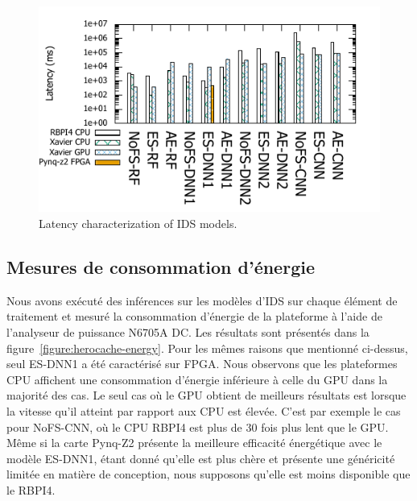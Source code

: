 \begin{figure}
    \centering
    \includegraphics[width=0.9\columnwidth]{5_Chapitre5/figures/latency_bar.pdf}
    \caption{Latency characterization of IDS models.}
    \label{figure:herocache-performance}
\end{figure}


\subsection{Mesures de consommation d'énergie}

Nous avons exécuté des inférences sur les modèles d'IDS sur chaque élément de traitement et mesuré la consommation d'énergie de la plateforme à l'aide de l'analyseur de puissance N6705A DC. Les résultats sont présentés dans la figure~\ref{figure:herocache-energy}. Pour les mêmes raisons que mentionné ci-dessus, seul ES-DNN1 a été caractérisé sur FPGA. Nous observons que les plateformes CPU affichent une consommation d'énergie inférieure à celle du GPU dans la majorité des cas. Le seul cas où le GPU obtient de meilleurs résultats est lorsque la vitesse qu'il atteint par rapport aux CPU est élevée. C'est par exemple le cas pour NoFS-CNN, où le CPU RBPI4 est plus de 30 fois plus lent que le GPU. Même si la carte Pynq-Z2 présente la meilleure efficacité énergétique avec le modèle ES-DNN1, étant donné qu'elle est plus chère et présente une généricité limitée en matière de conception, nous supposons qu'elle est moins disponible que le RBPI4.


